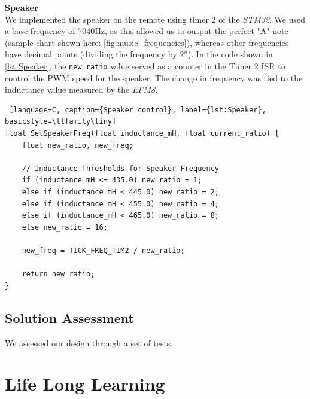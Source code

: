 \documentclass{article}
\begin{document}
\textbf{Speaker} \\
We implemented the speaker on the remote using timer 2 of the \textit{STM32}. We used a base frequency of 7040Hz, as this allowed us to output the perfect "A" note (sample chart shown here: \ref{fig:music_frequencies}), whereas other frequencies have decimal points (dividing the frequency by $2^n$).
In the code shown in \ref{lst:Speaker}, the \texttt{new\_ratio} value served as a counter in the Timer 2 ISR to control the PWM speed for the speaker.
The change in frequency was tied to the inductance value measured by the \textit{EFM8}.

\begin{lstlisting} [language=C, caption={Speaker control}, label={lst:Speaker}, basicstyle=\ttfamily\tiny]
float SetSpeakerFreq(float inductance_mH, float current_ratio) {
    float new_ratio, new_freq;

    // Inductance Thresholds for Speaker Frequency
    if (inductance_mH <= 435.0) new_ratio = 1;
    else if (inductance_mH < 445.0) new_ratio = 2;
    else if (inductance_mH < 455.0) new_ratio = 4;
    else if (inductance_mH < 465.0) new_ratio = 8;
    else new_ratio = 16;

    new_freq = TICK_FREQ_TIM2 / new_ratio;

    return new_ratio;
}
\end{lstlisting}



\noindent



\subsection{Solution Assessment}

We assessed our design through a set of tests.


\section{Life Long Learning}
\end{document}
